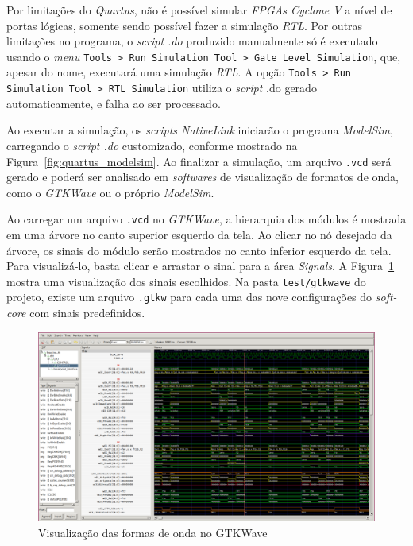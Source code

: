     { Por limitações do \textit{Quartus}, não é possível simular
        \textit{FPGAs Cyclone V} a nível de portas lógicas, somente sendo possível
        fazer a simulação \textit{RTL}. Por outras limitações no programa, o
        \textit{script .do} produzido manualmente só é executado usando o
        \textit{menu} \texttt{Tools > Run Simulation Tool > Gate Level Simulation},
        que, apesar do nome, executará uma simulação \textit{RTL}. A opção
        \texttt{Tools > Run Simulation Tool > RTL Simulation} utiliza o \textit{script}
        .do gerado automaticamente, e falha ao ser processado.
    }

    { Ao executar a simulação, os \textit{scripts NativeLink} iniciarão o
        programa \textit{ModelSim}, carregando o \textit{script .do} customizado,
        conforme mostrado na Figura~\ref{fig:quartus_modelsim}. Ao finalizar a
        simulação, um arquivo \texttt{.vcd} será gerado e poderá ser analisado
        em \textit{softwares} de visualização de formatos de onda, como o
        \textit{GTKWave} ou o próprio \textit{ModelSim}.
    }

    { Ao carregar um arquivo \texttt{.vcd} no \textit{GTKWave}, a hierarquia
        dos módulos é mostrada em uma árvore no canto superior esquerdo da tela.
        Ao clicar no nó desejado da árvore, os sinais do módulo serão mostrados
        no canto inferior esquerdo da tela. Para visualizá-lo, basta clicar e
        arrastar o sinal para a área \textit{Signals}. A Figura~\ref{fig:gtkwave_generic}
        mostra uma visualização dos sinais escolhidos. Na pasta \texttt{test/gtkwave}
        do projeto, existe um arquivo \texttt{.gtkw} para cada uma das nove
        configurações do \textit{soft-core} com sinais predefinidos.
    }

    \begin{figure}[H]
    \centering
        \includegraphics[width=.9\linewidth]{../images/gtkwave/random.png}
        \caption{Visualização das formas de onda no GTKWave}
        \label{fig:gtkwave_generic}
    \end{figure}

